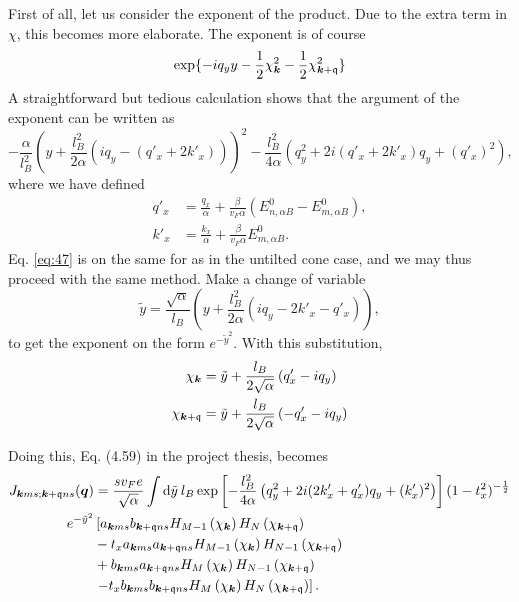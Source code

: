 First of all, let us consider the exponent of the product.
Due to the extra term in \(\chi\), this becomes more elaborate.
The exponent is of course
\begin{equation}
  \label{eq:46}
  \exp\{-i q_{y} y - \frac{1}{2} \chi_{\bm{k}} ^2 - \frac{1}{2} \chi _{\bm{k} + \mathfrak{q}}^2\}
\end{equation}
A straightforward but tedious calculation shows that the argument of the exponent can be written as
\begin{equation}
  \label{eq:47}
  -\frac{\alpha}{l_{B}^2} \left(y + \frac{l_{B}^2}{2 \alpha } (i q_{y} - (q'_x + 2 k'_x))\right)^2
  -\frac{l_{B}^2}{4 \alpha } (q_{y}^2 + 2i (q'_x + 2 k'_x) q_{y} + ( q' _{x} )^2 ),
\end{equation}
where we have defined
\begin{align}
  q' _x &= \frac{q_x}{\alpha } + \frac{\beta}{v_{F} \alpha }( E^0_{n,\alpha B} - E^0_{m, \alpha B} ),\\
  k' _x &= \frac{k_x}{\alpha } + \frac{\beta}{v_F \alpha } E^0_{m, \alpha B}.
\end{align}
Eq. \eqref{eq:47} is on the same for as in the untilted cone case, and we may thus proceed with the same method.
Make a change of variable
\[
\tilde{y} = \frac{\sqrt{\alpha }}{l_{B}} \left(y + \frac{l_{B}^2}{2\alpha } (iq_{y} - 2 k' _x - q' _x )\right),
\]
to get the exponent on the form \(e^{-\tilde{y}^2}\).
With this substitution,
\begin{align}
  \chi _{\bm{k}} &= \tilde{y} + \frac{l_{B}}{2 \sqrt{\alpha }} \left(q' _x - i q_{y}\right)\\
  \chi _{\bm{k} + \mathfrak{q}} &= \tilde{y} + \frac{l_{B}}{2 \sqrt{\alpha }} \left(- q' _x - i q_{y}\right)
\end{align}

Doing this, Eq. (4.59)  in the project thesis, becomes
\begin{equation}
  \label{eq:28}
  \begin{split}
    J_{\bm{k}ms; \bm{k}+\mathfrak{q} ns}(\bm{q}) &=
    \frac{s v_F e}{\sqrt{\alpha }} \int \mathrm{d}\tilde{y} \: l_B
    \exp \left[
      -\frac{l_{B}^2}{4 \alpha } \left(q_{y}^2 + 2i (2 k' _x + q' _x) q_{y} + (k'_x)^2 \right)
    \right]
    (1-t_{x}^2)^{-\frac{1}{2}}\\
    e^{-\tilde{y}^2}
   &\left[
    a_{\bm{k}ms}b_{\bm{k} + \mathfrak{q} ns}
    H_{M-1} \left(  \chi_{\bm{k}} \right)
    H_N\left( \chi_{\bm{k} + \mathfrak{q}} \right) \right.\\
    &- t_{x} a_{\bm{k}ms}a_{\bm{k} + \mathfrak{q} ns}
    H_{M-1} \left( \chi_{\bm{k}} \right)
    H_{N-1}\left( \chi_{\bm{k} + \mathfrak{q}} \right)\\
   & +
    b_{\bm{k}ms} a_{\bm{k} + \mathfrak{q} ns}
    H_M \left( \chi_{\bm{k}} \right)
    H_{N-1} \left( \chi_{\bm{k} + \mathfrak{q}} \right)\\
    &\left. - t_{x}
    b_{\bm{k}ms} b_{\bm{k} + \mathfrak{q} ns}
    H_M \left( \chi_{\bm{k}} \right)
    H_{N} \left(  \chi_{\bm{k} + \mathfrak{q}}\right)
    \right].
  \end{split}
\end{equation}

